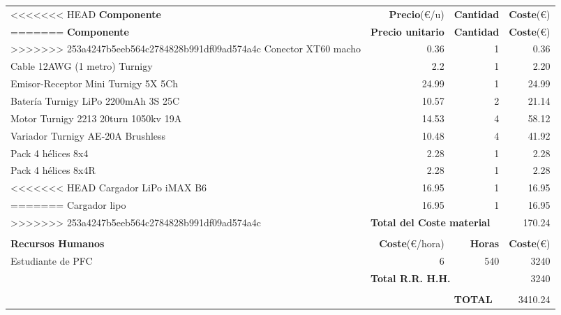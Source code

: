 \documentclass[twoside,11pt]{report}
\begin{document}
\hspace{-1cm}
\begin{tabular}{|l|r|r|r|}
\hline
<<<<<<< HEAD
\hspace{2cm}\textbf{Componente} & \textbf{Precio}(\euro /u) & \textbf{Cantidad} & \textbf{Coste}(\euro) \\
=======
\textbf{Componente} & \textbf{Precio unitario} & \textbf{Cantidad} & \textbf{Coste}(€) \\
>>>>>>> 253a4247b5eeb564c2784828b991df09ad574a4c
\hline
\hline
Conector XT60 macho & 0.36 & 1 & 0.36 \\
Cable 12AWG (1 metro) Turnigy & 2.2 & 1 & 2.20 \\
Emisor-Receptor Mini Turnigy 5X 5Ch & 24.99 & 1 & 24.99 \\
Batería Turnigy LiPo 2200mAh 3S 25C & 10.57 & 2 & 21.14 \\
Motor Turnigy 2213 20turn 1050kv 19A & 14.53 & 4 & 58.12 \\
Variador Turnigy AE-20A Brushless & 10.48 & 4 & 41.92 \\
Pack 4 hélices 8x4 & 2.28 & 1 & 2.28 \\
Pack 4 hélices 8x4R & 2.28 & 1 & 2.28 \\ 
<<<<<<< HEAD
Cargador LiPo iMAX B6 & 16.95 & 1 & 16.95 \\
\hline \cmidrule{2-4}
=======
Cargador lipo & 16.95 & 1 & 16.95 \\
\hline \cmidrule{3-4}
>>>>>>> 253a4247b5eeb564c2784828b991df09ad574a4c
\multicolumn{1}{r}{} & \multicolumn{2}{|l|}{\textbf{Total del Coste material}} & 170.24 \\ \cmidrule{2-4}
\multicolumn{4}{r}{} \\
\hline
\hspace{1.5cm}\textbf{Recursos Humanos} & \textbf{Coste}(\euro /hora) & \textbf{Horas} & \textbf{Coste}(\euro) \\
\hline
\hline
Estudiante de PFC & 6 & 540 & 3240 \\
\hline \cmidrule{2-4}
\multicolumn{1}{r}{} & \multicolumn{2}{|l|}{\textbf{Total R.R. H.H.}} & 3240 \\ \cmidrule{2-4}
\multicolumn{4}{r}{} \\
\cmidrule{3-4}
\multicolumn{2}{r}{} & \multicolumn{1}{|l|}{\textbf{TOTAL}} & 3410.24 \\ \cmidrule{3-4}
\end{tabular} 
\end{document}
